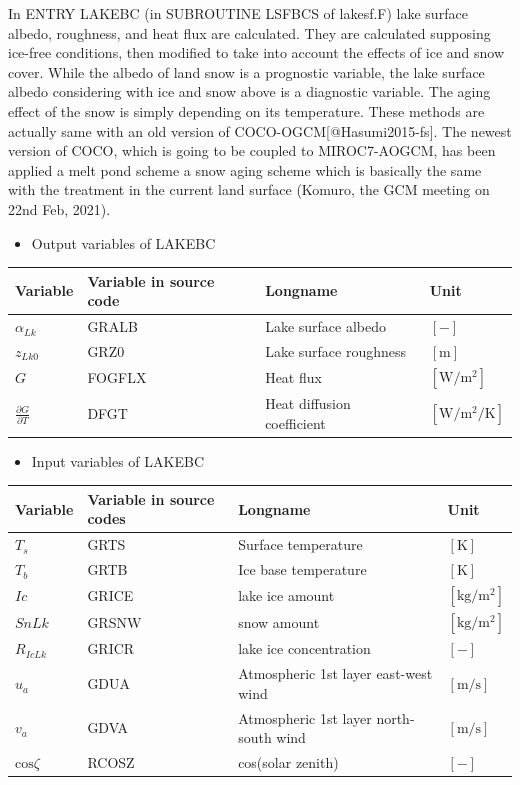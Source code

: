 In ENTRY LAKEBC (in SUBROUTINE LSFBCS of lakesf.F) lake surface albedo, roughness, and heat flux are calculated. They are calculated supposing ice-free conditions, then modified to take into account
the effects of ice and snow cover. While the albedo of land snow is a prognostic variable, the lake surface albedo considering with ice and snow above is a diagnostic variable. The aging effect of the
snow is simply depending on its temperature. These methods are actually same with an old version of COCO-OGCM{[}@Hasumi2015-fs{]}. The newest version of COCO, which is going to be coupled to
MIROC7-AOGCM, has been applied a melt pond scheme a snow aging scheme which is basically the same with the treatment in the current land surface (Komuro, the GCM meeting on 22nd Feb, 2021).

\begin{itemize}
\tightlist
\item
  Output variables of LAKEBC
\end{itemize}

\begin{longtable}[]{@{}llll@{}}
\toprule
Variable & Variable in source code & Longname & Unit \\
\midrule
\endhead
\(\alpha_{Lk}\) & GRALB & Lake surface albedo & \(\mathrm{[-]}\) \\
\(z_{Lk0}\) & GRZ0 & Lake surface roughness & \(\mathrm{[m]}\) \\
\(G\) & FOGFLX & Heat flux & \(\mathrm{[W/m^2]}\) \\
\(\frac{\partial G}{\partial T}\) & DFGT & Heat diffusion coefficient & \(\mathrm{[W/m^2/K]}\) \\
\bottomrule
\end{longtable}

\begin{itemize}
\tightlist
\item
  Input variables of LAKEBC
\end{itemize}

\begin{longtable}[]{@{}llll@{}}
\toprule
Variable & Variable in source codes & Longname & Unit \\
\midrule
\endhead
\(T_s\) & GRTS & Surface temperature & \(\mathrm{[K]}\) \\
\(T_b\) & GRTB & Ice base temperature & \(\mathrm{[K]}\) \\
\(Ic\) & GRICE & lake ice amount & \(\mathrm{[kg/m^2]}\) \\
\(SnLk\) & GRSNW & snow amount & \(\mathrm{[kg/m^2]}\) \\
\(R_{IcLk}\) & GRICR & lake ice concentration & \(\mathrm{[-]}\) \\
\(u_a\) & GDUA & Atmospheric 1st layer east-west wind & \(\mathrm{[m/s]}\) \\
\(v_a\) & GDVA & Atmospheric 1st layer north-south wind & \(\mathrm{[m/s]}\) \\
\(\mathrm{cos}\zeta\) & RCOSZ & cos(solar zenith) & \(\mathrm{[-]}\) \\
\bottomrule
\end{longtable}

